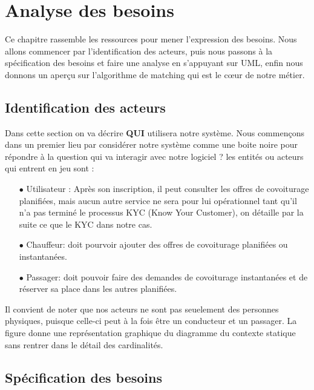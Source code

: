 \chapter{Analyse des besoins}
Ce chapitre rassemble les ressources pour mener l'expression des besoins. Nous allons commencer par l'identification des acteurs, puis nous passons à la spécification des besoins et faire une analyse en s'appuyant sur UML, enfin nous donnons un aperçu sur l'algorithme de matching qui est le cœur de notre métier.
\section{Identification des acteurs}
Dans cette section on va décrire \textbf{QUI} utilisera notre système. Nous commençons dans un premier lieu par considérer notre système comme une boite noire pour répondre à la question qui va interagir avec notre logiciel ?\newline
les entités ou acteurs qui entrent en jeu sont :
\begin{itemize}
	\item[$\bullet$] Utilisateur : Après son inscription, il peut consulter les offres de covoiturage planifiées, mais aucun autre service ne sera pour lui opérationnel tant qu'il n'a pas terminé le processus KYC (Know Your Customer), on détaille par la suite ce que le KYC dans notre cas.
	\item[$\bullet$] Chauffeur: doit pourvoir ajouter des offres de covoiturage planifiées ou instantanées.
	\item[$\bullet$] Passager: doit pouvoir faire des demandes de covoiturage instantanées et de réserver sa place dans les autres planifiées.
\end{itemize}
Il convient de noter que nos acteurs ne sont pas seuelement des personnes physiques, puisque celle-ci peut à la fois être un conducteur et un passager.\newline
La figure  donne une représentation graphique du diagramme du contexte statique sans rentrer dans le détail des cardinalités.

\section{Spécification des besoins}
